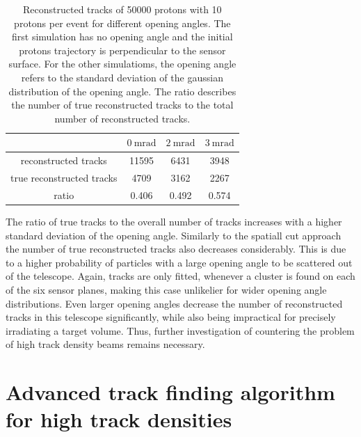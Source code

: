 \begin{table}
  \centering
  \begin{tabular}{c | c c c}
    \toprule
     &  $\SI{0}{\milli\radian}$ & $\SI{2}{\milli\radian}$ & $\SI{3}{\milli\radian}$\\
    \midrule
    reconstructed tracks & 11595 & 6431 & 3948  \\
    true reconstructed tracks & 4709 & 3162 & 2267 \\
    ratio & 0.406 & 0.492 & 0.574
  \end{tabular}
  \caption{Reconstructed tracks of 50000 protons with 10 protons per event for different opening angles. The first simulation has no opening angle and the initial protons
  trajectory is perpendicular to the sensor surface. For the other simulatioms, the opening angle refers to the standard deviation of the gaussian distribution of
  the opening angle. The ratio describes the number of true reconstructed tracks to the total number of reconstructed tracks.}
  \label{tab:angle}
\end{table}

The ratio of true tracks to the overall number of tracks increases with a higher standard deviation of the opening angle. Similarly to the spatiall cut approach the
number of true reconstructed tracks also decreases considerably. This is due to a higher probability of particles with a large opening angle to be scattered out of the telescope.
Again, tracks are only fitted, whenever a cluster is found on each of the six sensor planes, making this case unlikelier for wider opening angle distributions.
Even larger opening angles decrease the number of reconstructed tracks in this telescope significantly, while also being impractical for precisely irradiating a target volume.
Thus, further investigation of countering the problem of high track density beams remains necessary.

\section{Advanced track finding algorithm for high track densities}

